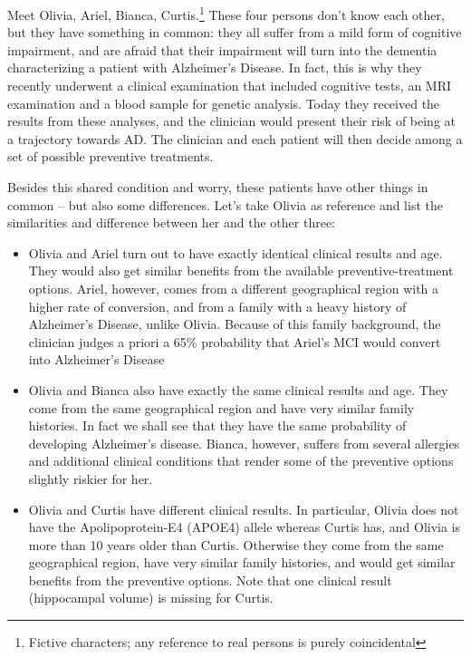 \documentclass[utf8]{FrontiersinHarvard} %
\renewcommand*{\|}[1][]{\nonscript\:#1\vert\nonscript\:\mathopen{}}
\begin{document}
Meet Olivia, Ariel, Bianca, Curtis.\footnote{Fictive characters; any reference to real persons is purely coincidental}
These four persons don't know each other, but they have something in common: they all suffer from a mild form of cognitive impairment, and are afraid that their impairment will turn into the dementia characterizing a patient with Alzheimer's Disease. In fact, this is why they recently underwent a clinical examination that included cognitive tests, an MRI examination and a blood sample for genetic analysis. Today they received the results from these analyses, and the clinician would present their risk of being at a trajectory towards AD. 
The clinician and each patient will then decide among a set of possible preventive treatments.

Besides this shared condition and worry, these patients have other things in common -- but also some differences. Let's take Olivia as reference and list the similarities and difference between her and the other three:
\begin{itemize}
\item Olivia and Ariel turn out to have exactly identical clinical results and age. They would also get similar benefits from the available preventive-treatment options. Ariel, however, comes from a different geographical region with a higher rate of conversion, and from a family with a heavy history of Alzheimer's Disease, unlike Olivia. Because of this family background, the clinician judges a priori a 65\% probability that Ariel's MCI would convert into Alzheimer's Disease

\item Olivia and Bianca also have exactly the same clinical results and age. They come from the same geographical region and have very similar family histories. In fact we shall see that they have the same probability of developing Alzheimer's disease. Bianca, however, suffers from several allergies and additional clinical conditions that render some of the preventive options slightly riskier for her.

\item Olivia and Curtis have different clinical results. In particular, Olivia does not have the Apolipoprotein-E4 (APOE4) allele \citep{liuetal2013} whereas Curtis has, and Olivia is more than 10 years older than Curtis.  Otherwise they come from the same geographical region, have very similar family histories, and would get similar benefits from the preventive options. Note that one clinical result  (hippocampal volume) is missing for Curtis.
\end{itemize}
\end{document}
